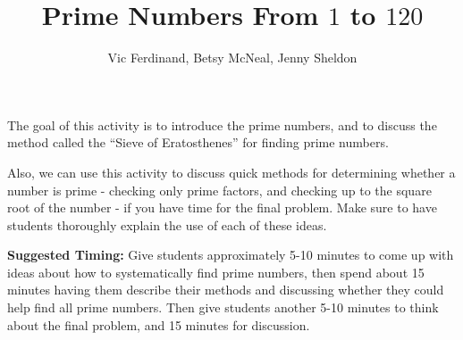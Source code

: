 \documentclass{ximera}
\title{Prime Numbers From $1$ to $120$}
\author{Vic Ferdinand, Betsy McNeal, Jenny Sheldon}
\begin{document}
\begin{abstract} \end{abstract}
\maketitle

\begin{instructorIntro}
The goal of this activity is to introduce the prime numbers, and to discuss the method called the ``Sieve of Eratosthenes'' for finding prime numbers.

Also, we can use this activity to discuss quick methods for determining whether a number is prime - checking only prime factors, and checking up to the square root of the number - if you have time for the final problem.  Make sure to have students thoroughly explain the use of each of these ideas.

{\bf Suggested Timing:} Give students approximately 5-10 minutes to come up with ideas about how to systematically find prime numbers, then spend about 15 minutes having them describe their methods and discussing whether they could help find all prime numbers.  Then give students another 5-10 minutes to think about the final problem, and 15 minutes for discussion.
\end{instructorIntro}
\end{document}
